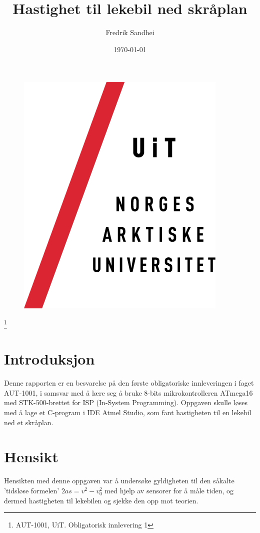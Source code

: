 \documentclass[11pt, a4paper]{article}
\begin{document}
\title{Hastighet til lekebil ned skråplan}
\author{Fredrik Sandhei}
\date{\today}
\maketitle
\begin{figure}[htbp]
	\begin{center}
		\includegraphics[scale = 1.5]{Uitlogo.png}
	\end{center}
\end{figure}
\footnote{AUT-1001, UiT. Obligatorisk innlevering 1}
\newpage
\tableofcontents
\newpage

\section{Introduksjon}
Denne rapporten er en besvarelse på den første obligatoriske innleveringen i faget AUT-1001, i samsvar med å lære seg å bruke 8-bits mikrokontrolleren ATmega16 med STK-500-brettet for ISP (In-System Programming). Oppgaven skulle løses med å lage et C-program i IDE Atmel Studio, som fant hastigheten til en lekebil ned et skråplan. 

\section{Hensikt}
Hensikten med denne oppgaven var å undersøke gyldigheten til den såkalte 'tidsløse formelen' $ 2as = v^{2} - v_{0}^{2} $ med hjelp av sensorer for å måle tiden, og dermed hastigheten til lekebilen og sjekke den opp mot teorien.
\end{document}
